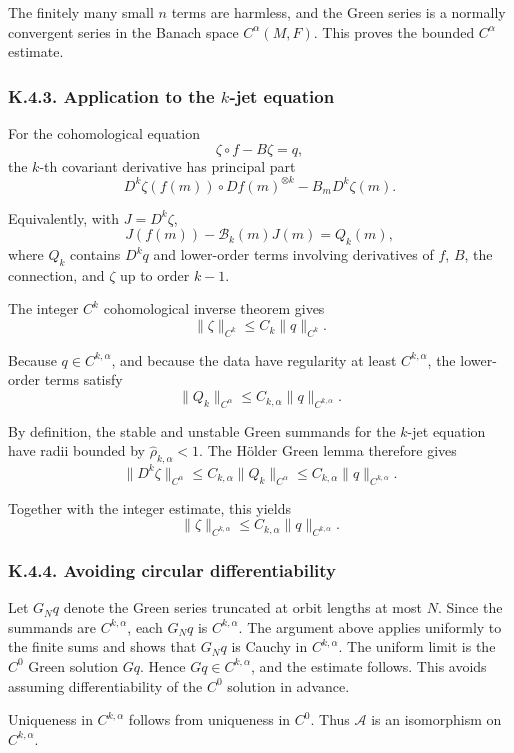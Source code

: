 \documentclass[12pt,a4paper]{article}
\theoremstyle{plain}
\numberwithin{equation}{section}
\numberwithin{theorem}{section}
\begin{document}
The finitely many small $n$ terms are harmless, and the Green series is a normally convergent series in the Banach space $C^\alpha(M,F)$. This proves the bounded $C^\alpha$ estimate.

\subsubsection{K.4.3. Application to the $k$-jet equation}

For the cohomological equation
\[
\zeta\circ f-B\zeta=q,
\]
the $k$-th covariant derivative has principal part
\[
D^k\zeta(f(m))
\circ Df(m)^{\otimes k}
-
B_mD^k\zeta(m).
\]

Equivalently, with $J=D^k\zeta$,
\[
J(f(m))-\mathscr B_k(m)J(m)=Q_k(m),
\]
where $Q_k$ contains $D^kq$ and lower-order terms involving derivatives of $f$, $B$, the connection, and $\zeta$ up to order $k-1$.

The integer $C^k$ cohomological inverse theorem gives
\[
\|\zeta\|_{C^k}
\le
C_k\|q\|_{C^k}.
\]

Because $q\in C^{k,\alpha}$, and because the data have regularity at least $C^{k,\alpha}$, the lower-order terms satisfy
\[
\|Q_k\|_{C^\alpha}
\le
C_{k,\alpha}\|q\|_{C^{k,\alpha}}.
\]

By definition, the stable and unstable Green summands for the $k$-jet equation have radii bounded by $\widehat\rho_{k,\alpha}<1$. The H\"older Green lemma therefore gives
\[
\|D^k\zeta\|_{C^\alpha}
\le
C_{k,\alpha}\|Q_k\|_{C^\alpha}
\le
C_{k,\alpha}
\|q\|_{C^{k,\alpha}}.
\]

Together with the integer estimate, this yields
\[
\|\zeta\|_{C^{k,\alpha}}
\le
C_{k,\alpha}\|q\|_{C^{k,\alpha}}.
\]

\subsubsection{K.4.4. Avoiding circular differentiability}

Let $G_Nq$ denote the Green series truncated at orbit lengths at most $N$. Since the summands are $C^{k,\alpha}$, each $G_Nq$ is $C^{k,\alpha}$. The argument above applies uniformly to the finite sums and shows that $G_Nq$ is Cauchy in $C^{k,\alpha}$. The uniform limit is the $C^0$ Green solution $Gq$. Hence $Gq\in C^{k,\alpha}$, and the estimate follows. This avoids assuming differentiability of the $C^0$ solution in advance.

Uniqueness in $C^{k,\alpha}$ follows from uniqueness in $C^0$. Thus $\mathcal A$ is an isomorphism on $C^{k,\alpha}$.
\end{document}
